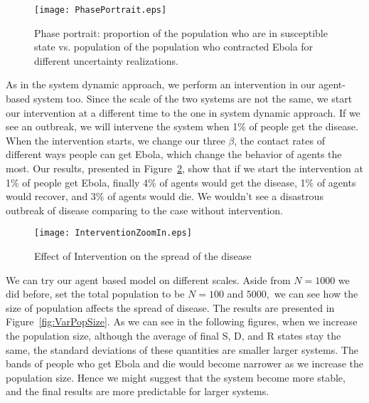 \begin{figure}[h!]
\begin{center}
\texttt{[image: PhasePortrait.eps]}
\end{center}
\caption{Phase portrait: proportion of the population who are in susceptible state vs. population of the population who contracted Ebola for different uncertainty realizations.}
\label{fig:PhasePortraitABM}
\end{figure}


As in the system dynamic approach, we perform an intervention in our agent-based system too. Since the scale of the two systems are not the same, we start our intervention at a different time to the one in system dynamic approach. If we see an outbreak, we will intervene the system when 1\% of people get the disease. When the intervention starts, we change our three $\beta$, the contact rates of different ways people can get Ebola, which change the behavior of agents the most. Our results, presented in Figure~\ref{fig:Intervention}, show that if we start the intervention at 1\% of people get Ebola, finally 4\% of agents would get the disease, 1\% of agents would recover, and 3\% of agents would die. We wouldn't see a disastrous outbreak of disease comparing to the case without intervention. 


\begin{figure}[h!]
\begin{center}
\texttt{[image: InterventionZoomIn.eps]}
\end{center}
\caption{Effect of Intervention on the spread of the disease }
\label{fig:Intervention}
\end{figure}


We can try our agent based model on different scales. Aside from $N = 1000$ we did before, set the total population to be $N = 100$ and $5000,$ we can see how the size of population affects the spread of disease. The results are presented in Figure~\ref{fig:VarPopSize}. As we can see in the following figures, when we increase the population size, although the average of final S, D, and R states stay the same, the standard deviations of these quantities are smaller larger systems. The bands of people who get Ebola and die would become narrower as we increase the population size. Hence we might suggest that the system become more stable, and the final results are more predictable for larger systems.

